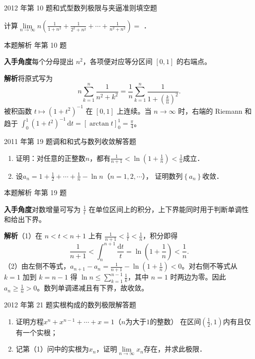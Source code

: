 \documentclass[UTF8,zihao=-4,fontset=fandol]{ctexart}
\renewcommand{\lim}{\operatorname*{lim}\limits}
\newcommand{\blank}{\underline{\hspace{5em}}}
\newcommand{\QuestionPage}[6]{%
  \par\noindent\begin{minipage}{\linewidth}
  \raggedright
  {\small\textcolor{black!60}{#3\quad #5}\hfill\textcolor{accent}{#2}}\par\smallskip}
\newcommand{\QuestionEnd}{\end{minipage}\par\medskip}
\newcommand{\QuestionPage}[6]{%
  \clearpage
  {\small\textcolor{accent}{#1\hfill #2}}\par\medskip
  {\small\textcolor{black!60}{#3\quad #5\hfill #6}}\par\vspace{9bp}}
\newcommand{\QuestionEnd}{}
\newenvironment{QuestionSolution}[1]{%
  \clearpage
  {\small\textcolor{black!60}{本题解析\quad #1}}\par\medskip
}{\par\clearpage}
\begin{document}
\QuestionPage{1.2 数列的极限}{填空题}{2012 年第 10 题}{2}{和式型数列极限与夹逼准则}{007 / 234}
计算$\lim_{n \to \infty} n\left(\frac{1}{1 + n^2} + \frac{1}{2^2 + n^2}
+ \cdots + \frac{1}{n^2 + n^2} \right) =$ \blank{}．
\QuestionEnd

\begin{QuestionSolution}{2012 年第 10 题}
\textbf{入手角度}\quad 每个分母提出 \(n^2\)，各项便对应等分区间 \([0,1]\) 的右端点。

\textbf{解析}\quad 将原式写为
\[
n\sum_{k=1}^n\frac{1}{n^2+k^2}
=\frac1n\sum_{k=1}^n\frac{1}{1+(\frac{k}{n})^2}.
\]
被积函数 \(t\mapsto(1+t^2)^{-1}\) 在 \([0,1]\) 上连续。当 \(n\to\infty\) 时，右端的 Riemann 和趋于 \(\int_0^1(1+t^2)^{-1}\,\mathrm{d}t=[\arctan t]_0^1=\boxed{\frac{\pi}{4}}\)。
\end{QuestionSolution}

\QuestionPage{1.2 数列的极限}{解答题}{2011 年第 19 题}{3}{调和和式与数列收敛}{008 / 234}
\begin{enumerate}
\item
证明：对任意的正整数$n$，都有$\frac{1}{n + 1} < \ln \left(1 + \frac{1}{n} \right) < \frac{1}{n}$成立．
\item
设$a_n = 1 + \frac{1}{2} + \cdots + \frac{1}{n} - \ln n$（$n = 1,2, \cdots$），
证明数列$\left\{a_n \right\}$收敛．
\end{enumerate}
\QuestionEnd

\begin{QuestionSolution}{2011 年第 19 题}
\textbf{入手角度}\quad 对数增量可写为 \(\frac{1}{t}\) 在单位区间上的积分，上下界能同时用于判断单调性和给出下界。

\textbf{解析}\quad （1）在 \(n<t<n+1\) 上有 \(\frac{1}{n+1}<\frac{1}{t}<\frac{1}{n}\)，积分即得
\[
\frac1{n+1}<\int_n^{n+1}\frac{\mathrm{d}t}{t}
=\ln(1+\frac{1}{n})<\frac1n.
\]
（2）由左侧不等式，\(a_{n+1}-a_n=\frac{1}{n+1}-\ln(1+\frac{1}{n})<0\)。对右侧不等式从 \(k=1\) 加到 \(k=n-1\) 得
\(\ln n\le\sum_{k=1}^{n-1}\frac{1}{k}\)，其中 \(n=1\) 时两边为零。因此 \(a_n\ge \frac{1}{n}>0\)。数列单调递减且有下界，故收敛。
\end{QuestionSolution}

\QuestionPage{1.2 数列的极限}{解答题}{2012 年第 21 题}{4}{实根构成的数列极限}{009 / 234}
\begin{enumerate}
\item
证明方程$x^n + x^{n - 1} + \cdots + x = 1$（$n$为大于$1$的整数）
在区间$\left(\frac{1}{2},1 \right)$内有且仅有一个实根；
\item
记第（1）问中的实根为$x_n$，证明$\lim_{n \to \infty} x_n$存在，并求此极限．
\end{enumerate}
\QuestionEnd
\end{document}
